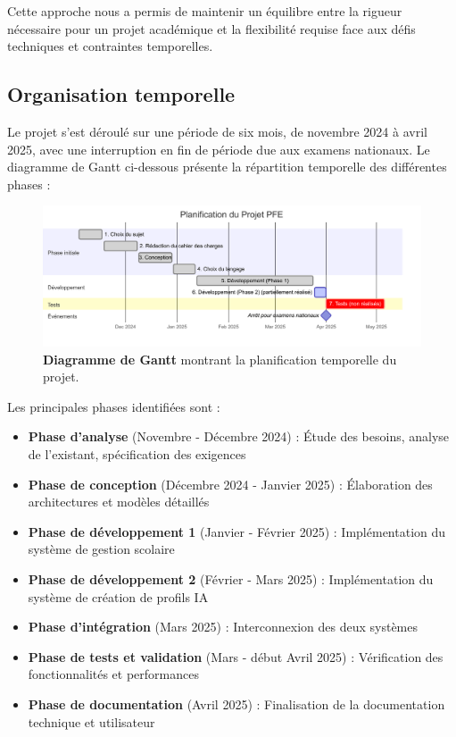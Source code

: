 Cette approche nous a permis de maintenir un équilibre entre la rigueur nécessaire pour un projet académique et la flexibilité requise face aux défis techniques et contraintes temporelles.

\subsection{Organisation temporelle}

Le projet s'est déroulé sur une période de six mois, de novembre 2024 à avril 2025, avec une interruption en fin de période due aux examens nationaux. Le diagramme de Gantt ci-dessous présente la répartition temporelle des différentes phases :

\begin{figure}[H]
  \centering
  \includegraphics[width=1.0\textwidth,keepaspectratio]{pfe-pics/diagrames/Mermaid Chart - Create complex, visual diagrams with text. A smarter way of creating diagrams.-2025-06-10-203842.png}
  \caption{\textbf{Diagramme de Gantt} montrant la planification temporelle du projet.}
  \label{fig:gantt_chart}
\end{figure}

Les principales phases identifiées sont :

\begin{itemize}
  \item \textbf{Phase d'analyse} (Novembre - Décembre 2024) : Étude des besoins, analyse de l'existant, spécification des exigences
  
  \item \textbf{Phase de conception} (Décembre 2024 - Janvier 2025) : Élaboration des architectures et modèles détaillés
  
  \item \textbf{Phase de développement 1} (Janvier - Février 2025) : Implémentation du système de gestion scolaire
  
  \item \textbf{Phase de développement 2} (Février - Mars 2025) : Implémentation du système de création de profils IA
  
  \item \textbf{Phase d'intégration} (Mars 2025) : Interconnexion des deux systèmes
  
  \item \textbf{Phase de tests et validation} (Mars - début Avril 2025) : Vérification des fonctionnalités et performances
  
  \item \textbf{Phase de documentation} (Avril 2025) : Finalisation de la documentation technique et utilisateur
\end{itemize}

